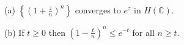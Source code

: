 (a) $\left\{ \left(1 + \frac{z}{n}\right)^n \right\}$ converges to $e^z$ in $H(\mathbb{C})$.

(b) If $t \geq 0$ then $\left(1 - \frac{t}{n}\right)^n \leq e^{-t}$ for all $n \geq t$.